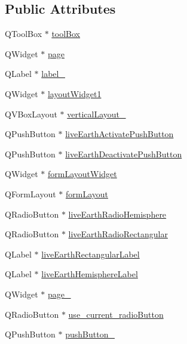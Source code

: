 \subsection*{Public Attributes}
\begin{DoxyCompactItemize}
\item 
QToolBox $\ast$ \hyperlink{classUi__Extras_ab6d937b70fceb48a3e7eaa028b5af17a}{toolBox}
\item 
QWidget $\ast$ \hyperlink{classUi__Extras_a4f4b0eb303e7bd48ab30a1d3cd0e0b32}{page}
\item 
QLabel $\ast$ \hyperlink{classUi__Extras_a0a5ec50ecaca1072b40e7857397ef890}{label\_}
\item 
QWidget $\ast$ \hyperlink{classUi__Extras_afa6756d7678bcf68325320b8d0260551}{layoutWidget1}
\item 
QVBoxLayout $\ast$ \hyperlink{classUi__Extras_a20949d17f93ae9a7fd7a3f2cf309ccad}{verticalLayout\_}
\item 
QPushButton $\ast$ \hyperlink{classUi__Extras_ac6fd999821ea077a5a9fb543acc16fd4}{liveEarthActivatePushButton}
\item 
QPushButton $\ast$ \hyperlink{classUi__Extras_a0591653135ec37cba2db9a7cebc06393}{liveEarthDeactivatePushButton}
\item 
QWidget $\ast$ \hyperlink{classUi__Extras_a4ad0a03d033f96f16367da8b3d8adf3e}{formLayoutWidget}
\item 
QFormLayout $\ast$ \hyperlink{classUi__Extras_a82e2d79ca46ef7f7009de5b8364830ee}{formLayout}
\item 
QRadioButton $\ast$ \hyperlink{classUi__Extras_a610559fbdb9e6613573ed1f8a5b3e2db}{liveEarthRadioHemisphere}
\item 
QRadioButton $\ast$ \hyperlink{classUi__Extras_a82b9691ce85e1f9a0acc5b7b3ecb93d9}{liveEarthRadioRectangular}
\item 
QLabel $\ast$ \hyperlink{classUi__Extras_a47b81ab7a2a08615128f151dd5598384}{liveEarthRectangularLabel}
\item 
QLabel $\ast$ \hyperlink{classUi__Extras_a32d0c47f2bdb36fa0dce8dc81bc51223}{liveEarthHemisphereLabel}
\item 
QWidget $\ast$ \hyperlink{classUi__Extras_a328f350266fb266b688ca9e27b47ccfe}{page\_}
\item 
QRadioButton $\ast$ \hyperlink{classUi__Extras_ad156478b17efed331b8d0663c871816a}{use\_\-current\_\-radioButton}
\item 
QPushButton $\ast$ \hyperlink{classUi__Extras_aa1564e61ad2e27f314d022fed8d86383}{pushButton\_}
\item 

\end{DoxyCompactItemize}
